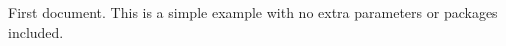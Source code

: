 \documentclass{article}
\begin{document}
	First document. This is a simple example with no
	extra parameters or packages included.
\end{document}
